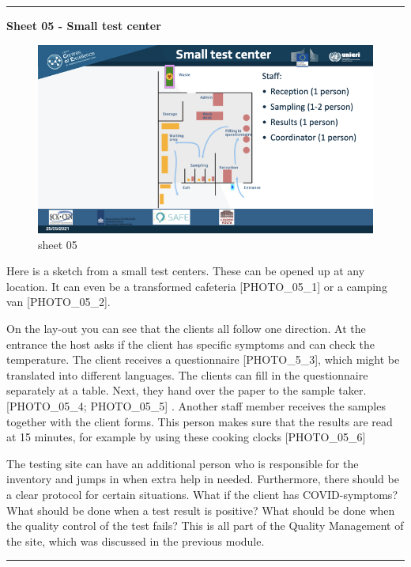 \documentclass[
]{book}
\begin{document}
\begin{center}\rule{0.5\linewidth}{0.5pt}\end{center}

\textbf{Sheet 05 - Small test center}

\begin{figure}
\centering
\includegraphics{images/m05/m05_Workflow_final.005.jpeg}
\caption{sheet 05}
\end{figure}

Here is a sketch from a small test centers. These can be opened up at
any location. It can even be a transformed cafeteria {[}PHOTO\_05\_1{]} or a
camping van {[}PHOTO\_05\_2{]}.

On the lay-out you can see that the clients all follow one direction. At
the entrance the host asks if the client has specific symptoms and can
check the temperature. The client receives a questionnaire
{[}PHOTO\_5\_3{]}, which might be translated into different languages. The
clients can fill in the questionnaire separately at a table. Next, they
hand over the paper to the sample taker. {[}PHOTO\_05\_4; PHOTO\_05\_5{]} .
Another staff member receives the samples together with the client
forms. This person makes sure that the results are read at 15 minutes,
for example by using these cooking clocks {[}PHOTO\_05\_6{]}

The testing site can have an additional person who is responsible for
the inventory and jumps in when extra help in needed. Furthermore, there
should be a clear protocol for certain situations. What if the client
has COVID-symptoms? What should be done when a test result is positive?
What should be done when the quality control of the test fails? This is
all part of the Quality Management of the site, which was discussed in
the previous module.

\begin{center}\rule{0.5\linewidth}{0.5pt}\end{center}
\end{document}
